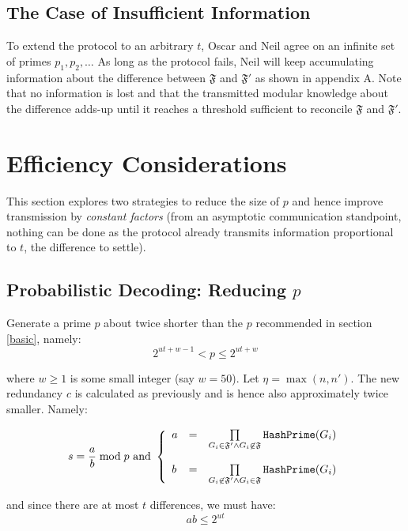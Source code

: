 \documentclass[11pt]{llncs}
\begin{document}
\subsection{The Case of Insufficient Information}
\label{insuf}
To extend the protocol to an arbitrary $t$, Oscar and Neil agree on an infinite set of primes $p_1,p_2,\ldots$ As long as the protocol fails, Neil will keep accumulating information about the difference between $\mathfrak{F}$ and $\mathfrak{F}'$ as shown in appendix A. Note that no information is lost and that the transmitted modular knowledge about the difference adds-up until it reaches a threshold sufficient to reconcile $\mathfrak{F}$ and $\mathfrak{F}'$.\smallskip

\section{Efficiency Considerations}

This section explores two strategies to reduce the size of $p$ and hence improve transmission by {\sl constant factors} (from an asymptotic communication standpoint, nothing can be done as the protocol already transmits information proportional to $t$, the difference to settle).

\subsection{Probabilistic Decoding: Reducing $p$}

Generate a prime $p$ about twice shorter than the $p$ recommended in section \ref{basic}, namely:
\begin{equation}
\label{eqnewp}
2^{ut+w-1}<p \leq 2^{ut+w}
\end{equation}

where $w \geq 1$ is some small integer (say $w=50$). Let $\eta=\max(n,n')$. The new redundancy $c$ is calculated as previously and is hence also approximately twice smaller. Namely:

$$s=\frac{a}{b} \bmod p \mbox{~and~}
\left\{
\begin{array}{lcr}
a & =&  \prod\limits_{G_i \in \mathfrak{F}'\wedge G_i \not\in\mathfrak{F}} \mbox{{\tt HashPrime}}(G_i) \\
\\
b & = & \prod\limits_{G_i \not\in\mathfrak{F}' \wedge G_i \in\mathfrak{F}} \mbox{{\tt HashPrime}}(G_i)
\end{array}
\right.
$$

and since there are at most $t$ differences, we must have:
\begin{equation}
\label{eqab}
a b \leq 2^{ut}
\end{equation}
\end{document}
